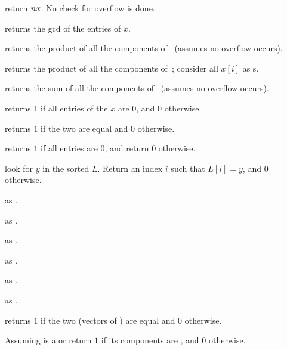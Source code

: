 

 return $n\*x$. No check for overflow is
done.

 returns the gcd of the entries of $x$.


 returns the product of all the components
of~ (assumes no overflow occurs).

 returns the product of all the components
of~; consider all $x[i]$ as s.

 returns the sum of all the components
of~ (assumes no overflow occurs).

 returns 1 if all entries of the  $x$ are $0$,
and $0$ otherwise.

 returns $1$ if the two  are equal
and $0$ otherwise.

 returns $1$ if all entries are $0$, and return
$0$ otherwise.

 look for $y$ in the sorted
 $L$. Return an index $i$ such that $L[i] = y$, and  $0$ otherwise.

 as .

 as .

 as .

 as .

 as .

 as .

 returns $1$ if the two  (vectors
of ) are equal and $0$ otherwise.


 Assuming  is a 
or  return $1$ if its components are , and $0$ otherwise.



